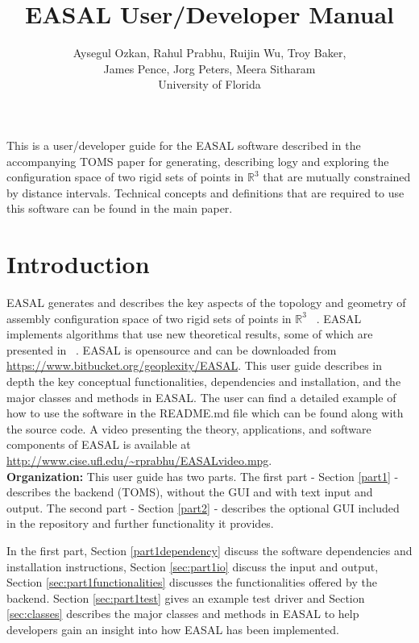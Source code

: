 \documentclass[10pt]{article}
\title{EASAL User/Developer Manual}
\author{Aysegul Ozkan, Rahul Prabhu, Ruijin Wu, Troy Baker, \\James Pence, Jorg
Peters, Meera Sitharam \\ University of Florida}
\begin{document}
\maketitle
This is a user/developer guide for the EASAL software described in the 
accompanying TOMS paper for generating, describing logy and exploring the 
configuration space of two rigid sets of points in $\mathbb{R}^3$ that are mutually 
constrained by distance intervals. Technical concepts and definitions that are 
required to use this software can be found in the main paper.


\section{Introduction}
EASAL generates and describes the key aspects of the topology and geometry of
assembly configuration space of two rigid sets of points in $\mathbb{R}^3$
~\cite{Sitharam:2012:EASAL, Ozkan2014MainEasal, Wu2014Virus}. EASAL implements
algorithms that use new theoretical results, some of which are presented in
~\cite{Ozkan2014MainEasal, SiGa:2010, Sitharam:2012:EASAL}.
EASAL is opensource and can be downloaded from
\url{https://www.bitbucket.org/geoplexity/EASAL}. This user guide describes in
depth the key conceptual functionalities, dependencies and installation, and
the major classes and methods in EASAL.  The user can find a detailed example
of how to use the software in the README.md file which can be found along with
the source code. A video presenting the theory, applications, and software
components of EASAL is available at
\url{http://www.cise.ufl.edu/~rprabhu/EASALvideo.mpg}.\\

\noindent\textbf{Organization:} 
This user guide has two parts. The first part - Section \ref{part1} - describes
the backend (TOMS), without the GUI and with text input and output. The second
part - Section \ref{part2} - describes the optional GUI included in the
repository and further functionality it provides.


In the first part, Section \ref{part1dependency} discuss the software
dependencies and installation instructions, Section \ref{sec:part1io} discuss
the input and output, Section \ref{sec:part1functionalities} discusses the
functionalities offered by the backend. Section \ref{sec:part1test} gives an
example test driver and Section \ref{sec:classes} describes the major classes
and methods in EASAL to help developers gain an insight into how EASAL has been
implemented.
\end{document}
